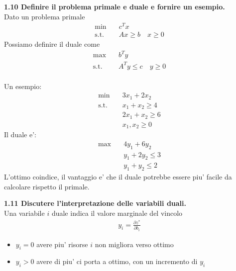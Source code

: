 \documentclass[a4paper,11pt]{article}
\newcommand{\domanda}[2]{%
  \vspace{0.6em}
  \noindent\textbf{#1}\\[0.2em]
  \noindent#2
  \vspace{1em}
  \par
}
\begin{document}
\domanda{1.10 \quad Definire il problema primale e duale e fornire un esempio.}{
Dato un problema primale
\begin{align*}
    \min \quad &c^Tx \\
    \text{s.t. }\quad &Ax \geq b \quad x\geq 0
\end{align*}
Possiamo definire il duale come
\begin{align*}
    \max \quad &b^T y\\
    \text{s.t.}\quad &A^Ty \leq c \quad y \geq 0
\end{align*}
\vspace{1px}\\
Un esempio:
\begin{align*}
    \min \quad &3x_1 + 2x_2 \\
    \text{s.t.}\quad &x_1+x_2 \geq 4\\
    &2x_1+x_2 \geq 6\\
    &x_1,x_2 \geq 0
\end{align*}
Il duale e':
\begin{align*}
    \max \quad & 4y_1 + 6y_2\\
    &y_1 + 2y_2 \leq 3\\
    &y_1 + y_2 \leq 2
\end{align*}
L'ottimo coindice, il vantaggio e' che il duale potrebbe essere piu' facile da calcolare rispetto il primale.
}

\domanda{1.11 \quad Discutere l'interpretazione delle variabili duali.}{
Una variabile $i$ duale indica il valore marginale del vincolo
\begin{align*}
    y_i = \frac{\partial z^*}{\partial b_i}
\end{align*}
\begin{itemize}
    \item $y_i=0$ avere piu' risorse $i$ non migliora verso ottimo
    \item $y_i >0$ avere di piu' ci porta a ottimo, con un incremento di $y_i$
\end{itemize}
}
\end{document}

